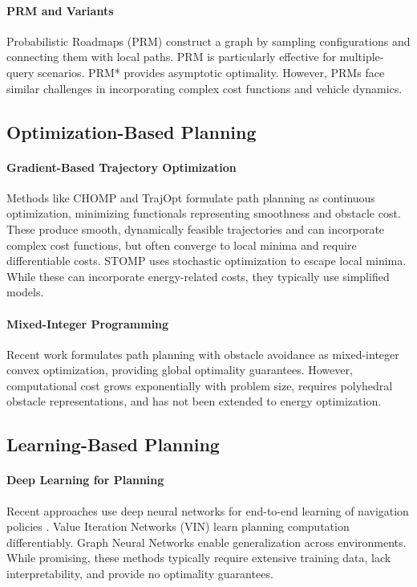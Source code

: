 \paragraph{PRM and Variants}
Probabilistic Roadmaps (PRM) \cite{Kavraki1996} construct a graph by sampling configurations and connecting them with local paths. PRM is particularly effective for multiple-query scenarios. PRM* \cite{Karaman2011} provides asymptotic optimality. However, PRMs face similar challenges in incorporating complex cost functions and vehicle dynamics.

\subsection{Optimization-Based Planning}

\paragraph{Gradient-Based Trajectory Optimization}
Methods like CHOMP \cite{Ratliff2009} and TrajOpt \cite{Schulman2013} formulate path planning as continuous optimization, minimizing functionals representing smoothness and obstacle cost. These produce smooth, dynamically feasible trajectories and can incorporate complex cost functions, but often converge to local minima and require differentiable costs. STOMP \cite{Kalakrishnan2011} uses stochastic optimization to escape local minima. While these can incorporate energy-related costs, they typically use simplified models.

\paragraph{Mixed-Integer Programming}
Recent work \cite{Deits2015,Marcucci2017} formulates path planning with obstacle avoidance as mixed-integer convex optimization, providing global optimality guarantees. However, computational cost grows exponentially with problem size, requires polyhedral obstacle representations, and has not been extended to energy optimization.

\subsection{Learning-Based Planning}

\paragraph{Deep Learning for Planning}
Recent approaches use deep neural networks for end-to-end learning of navigation policies \cite{Pfeiffer2017,Chen2017}. Value Iteration Networks (VIN) \cite{Tamar2016} learn planning computation differentiably. Graph Neural Networks \cite{Sartoretti2019} enable generalization across environments. While promising, these methods typically require extensive training data, lack interpretability, and provide no optimality guarantees.

